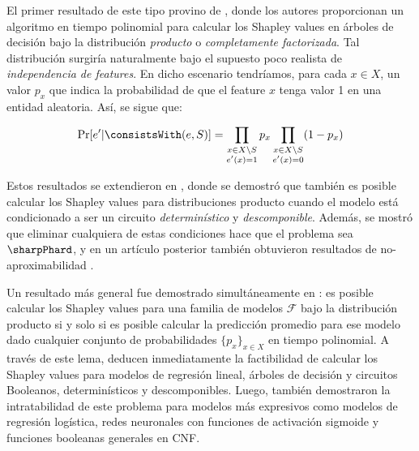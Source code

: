 
El primer resultado de este tipo provino de \cite{lundberg2020local}, donde los autores proporcionan un algoritmo en tiempo polinomial para calcular los Shapley values en árboles de decisión bajo la distribución \textit{producto} o \textit{completamente factorizada}. Tal distribución surgiría naturalmente bajo el supuesto poco realista de \textit{independencia de features}. En dicho escenario tendríamos, para cada \(x \in X\), un valor \(p_x\) que indica la probabilidad de que el feature \(x\) tenga valor 1 en una entidad aleatoria. Así, se sigue que:

\[
\Pr[e' | \consistsWith(e, S)] = \prod_{\substack{x \in X \setminus S \\ e'(x) = 1}} p_x \prod_{\substack{x \in X \setminus S \\ e'(x) = 0}} (1-p_x) 
\]

Estos resultados se extendieron en \cite{arenas2021tractability}, donde se demostró que también es posible calcular los Shapley values para distribuciones producto cuando el modelo está condicionado a ser un circuito \textit{determinístico} y \textit{descomponible}. Además, se mostró que eliminar cualquiera de estas condiciones hace que el problema sea \(\sharpPhard\), y en un artículo posterior también obtuvieron resultados de no-aproximabilidad \cite{arenas2023complexity}.

Un resultado más general fue demostrado simultáneamente en \cite{van2022tractability}: es posible calcular los Shapley values para una familia de modelos \(\mathcal{F}\) bajo la distribución producto si y solo si es posible calcular la predicción promedio para ese modelo dado cualquier conjunto de probabilidades \(\{p_x\}_{x \in X}\) en tiempo polinomial. A través de este lema, deducen inmediatamente la factibilidad de calcular los Shapley values para modelos de regresión lineal, árboles de decisión y circuitos Booleanos, determinísticos y descomponibles. Luego, también demostraron la intratabilidad de este problema para modelos más expresivos como modelos de regresión logística, redes neuronales con funciones de activación sigmoide y funciones booleanas generales en CNF.

